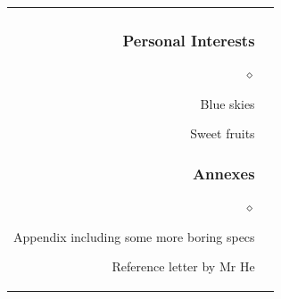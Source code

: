 \documentclass[a4paper]{article}
\renewenvironment{itemize}{
  \begin{list}{$\diamond$}{
    \setlength{\topsep}{0.25em}
    \setlength{\itemsep}{0em}
    \setlength{\parskip}{0pt}
    \setlength{\parsep}{0em}
  }
}{
  \end{list}
}
\begin{document}
\begin{longtable}{r || l}
\begin{minipage}{0.9\textwidth}
      \subsubsection*{Personal Interests}
      \begin{itemize}
          \item Blue skies
          \item Sweet fruits
      \end{itemize}

      \subsubsection*{Annexes}
      \begin{itemize}
          \item Appendix including some more boring specs
          \item Reference letter by Mr He
      \end{itemize}
      \vfill
    \end{minipage} \\

  \end{longtable}
\end{document}
